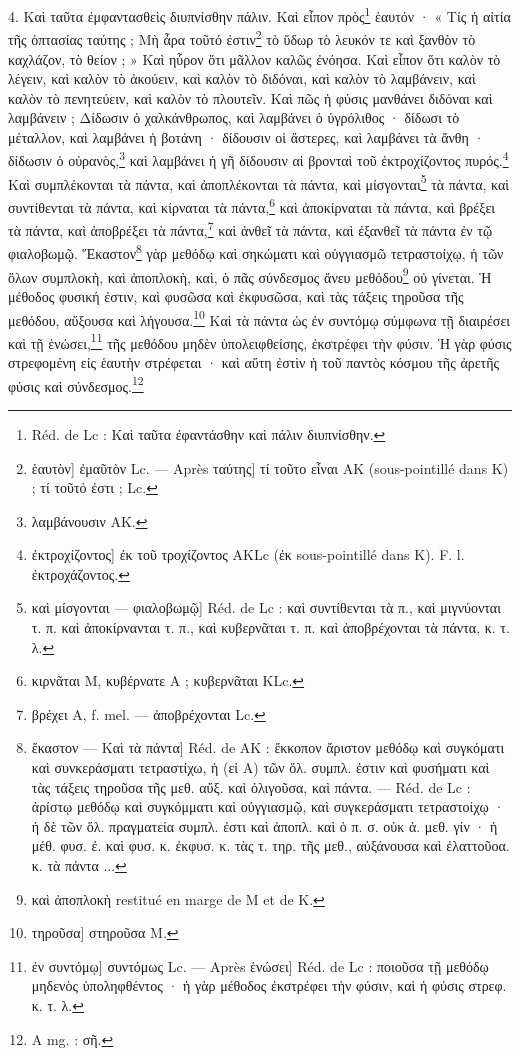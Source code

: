 \documentclass[a4paper, 11pt, oneside, polutonikogreek, french]{article}
\begin{document}
4. Καὶ ταῦτα ἐμφαντασθεὶς διυπνίσθην πάλιν. Καὶ εἶπον πρὸς\footnote{Réd. de Lc : Καὶ ταῦτα ἐφαντάσθην καὶ πάλιν διυπνίσθην.} ἑαυτόν · « Τίς ἡ αἰτία τῆς ὀπτασίας ταύτης ; Μὴ ἆρα τοῦτό ἐστιν\footnote{ἑαυτὸν] ἐμαῦτὸν Lc. --- Après ταύτης] τί τοῦτο εἶναι AK (sous-pointillé dans Κ) ; τί τοῦτό ἐστι ; Lc.} τὸ ὕδωρ τὸ λευκόν τε καὶ ξανθὸν τὸ καχλάζον, τὸ θείον ; » Καὶ ηὗρον ὅτι μᾶλλον καλῶς ἐνόησα. Καὶ εἶπον ὅτι καλὸν τὸ λέγειν, καὶ καλὸν τὸ ἀκούειν, καὶ καλὸν τὸ διδόναι, καὶ καλὸν τὸ λαμβάνειν, καὶ καλὸν τὸ πενητεύειν, καὶ καλὸν τὸ πλουτεῖν. Καὶ πῶς ἡ φύσις μανθάνει διδόναι καὶ λαμβάνειν ; Δίδωσιν ὁ χαλκάνθρωπος, καὶ λαμβάνει ὁ ὑγρόλιθος · δίδωσι τὸ μέταλλον, καὶ λαμβάνει ἡ βοτάνη · δίδουσιν οἱ ἄστερες, καὶ λαμβάνει τὰ ἄνθη · δίδωσιν ὁ οὐρανὸς,\footnote{λαμβάνουσιν AK.} καὶ λαμβάνει ἡ γῆ δίδουσιν αἱ βρονταὶ τοῦ ἐκτροχίζοντος πυρός.\footnote{ἐκτροχίζοντος] ἐκ τοῦ τροχίζοντος AKLc (ἐκ sous-pointillé dans K). F. l. ἐκτροχάζοντος.} Καὶ συμπλέκονται τὰ πάντα, καὶ ἀποπλέκονται τὰ πάντα, καὶ μίσγονται\footnote{καὶ μίσγονται --- φιαλοβωμῷ] Réd. de Lc : καὶ συντίθενται τὰ π., καὶ μιγνύονται τ. π. καὶ ἀποκίρνανται τ. π., καὶ κυβερνᾶται τ. π. καὶ ἀποβρέχονται τὰ πάντα, κ. τ. λ.} τὰ πάντα, καὶ συντίθενται τὰ πάντα, καὶ κίρναται τὰ πάντα,\footnote{κιρνᾶται M, κυβέρνατε A ; κυβερνᾶται KLc.} καὶ ἀποκίρναται τὰ πάντα, καὶ βρέξει τὰ πάντα, καὶ ἀποβρέξει τὰ πάντα,\footnote{βρέχει A, f. mel. --- ἀποβρέχονται Lc.} καὶ ἀνθεῖ τὰ πάντα, καὶ ἐξανθεῖ τὰ πάντα ἐν τῷ φιαλοβωμῷ. Ἕκαστον\footnote{ἕκαστον --- Καὶ τὰ πάντα] Réd. de AΚ : ἔκκοπον ἄριστον μεθόδῳ καὶ συγκόματι καὶ συνκεράσματι τετραστίχω, ἡ (εἰ A) τῶν ὅλ. συμπλ. ἐστιν καὶ φυσήματι καὶ τὰς τάξεις τηροῦσα τῆς μεθ. αὔξ. καὶ ὀλιγοῦσα, καὶ πάντα. --- Réd. de Lc : ἀρίστῳ μεθόδῳ καὶ συγκόμματι καὶ οὐγγιασμῷ, καὶ συγκεράσματι τετραστοίχῳ · ἡ δὲ τῶν ὅλ. πραγματεία συμπλ. ἐστι καὶ ἀποπλ. καὶ ὁ π. σ. οὐκ ἀ. μεθ. γίν · ἡ μέθ. φυσ. ἐ. καὶ φυσ. κ. ἐκφυσ. κ. τὰς τ. τηρ. τῆς μεθ., αὐξάνουσα καὶ ἐλαττοῦοα. κ. τὰ πάντα ...} γὰρ μεθόδῳ καὶ σηκώματι καὶ οὐγγιασμῶ τετραστοίχῳ, ἡ τῶν ὅλων συμπλοκὴ, καὶ ἀποπλοκὴ, καὶ, ὁ πᾶς σύνδεσμος ἄνευ μεθόδου\footnote{καὶ ἀποπλοκὴ restitué en marge de M et de K.} οὐ γίνεται. Ἡ μέθοδος φυσική ἐστιν, καὶ φυσῶσα καὶ ἐκφυσῶσα, καὶ τὰς τάξεις τηροῦσα τῆς μεθόδου, αὔξουσα καὶ λήγουσα.\footnote{τηροῦσα] στηροῦσα M.} Καὶ τὰ πάντα ὡς ἐν συντόμῳ σύμφωνα τῇ διαιρέσει καὶ τῇ ἑνώσει,\footnote{ἐν συντόμῳ] συντόμως Lc. --- Après ἑνώσει] Réd. de Lc : ποιοῦσα τῇ μεθόδῳ μηδενὸς ὑποληφθέντος · ἡ γὰρ μέθοδος ἐκστρέφει τὴν φύσιν, καὶ ἡ φύσις στρεφ. κ. τ. λ.} τῆς μεθόδου μηδὲν ὑπολειφθείσης, ἐκστρέφει τὴν φύσιν. Ἡ γὰρ φύσις στρεφομένη εἰς ἑαυτὴν στρέφεται · καὶ αὕτη ἐστὶν ἡ τοῦ παντὸς κόσμου τῆς ἀρετῆς φύσις καὶ σύνδεσμος.\footnote{A mg. : σῆ.}
\end{document}
